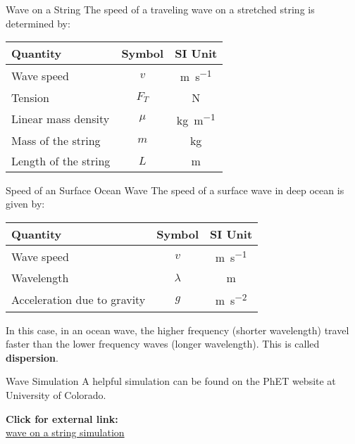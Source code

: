 \documentclass[12pt,aspectratio=169]{beamer}
\newcommand{\eq}[2]{\vspace{#1}{\Large\begin{displaymath}#2\end{displaymath}}}
\begin{document}
\begin{frame}{Wave on a String}
  The speed of a traveling wave on a stretched string is determined by:
  
  \eq{-.2in}{
    \boxed{v=\sqrt{\frac{F_T}{\mu}}}
    \quad\text{\normalsize where}\quad
    \boxed{\mu=\frac{m}L}
  }
  \begin{center}
    \begin{tabular}{l|c|c}
      \rowcolor{pink}
      \textbf{Quantity} & \textbf{Symbol} & \textbf{SI Unit} \\ \hline
      Wave speed           & $v$   & \si{\metre\per\second} \\
      Tension              & $F_T$ & \si\newton \\
      Linear mass density  & $\mu$ & \si{\kilo\gram\per\metre} \\
      Mass of the string   & $m$   & \si{\kilo\gram} \\
      Length of the string & $L$   & \si\metre
    \end{tabular}
  \end{center}
\end{frame}



\begin{frame}{Speed of an Surface Ocean Wave}
  The speed of a surface wave in deep ocean is given by:
  
  \eq{-.2in}{
    \boxed{v=\sqrt{\frac{\lambda g}{2\pi}}}
  }
  \begin{center}
    \begin{tabular}{l|c|c}
      \rowcolor{pink}
      \textbf{Quantity} & \textbf{Symbol} & \textbf{SI Unit} \\ \hline
      Wave speed           & $v$       & \si{\metre\per\second} \\
      Wavelength           & $\lambda$ & \si\metre \\
      Acceleration due to gravity & $g$ & \si{\metre\per\second\squared}
    \end{tabular}
  \end{center}
  In this case, in an ocean wave, the higher frequency (shorter wavelength)
  travel faster than the lower frequency waves (longer wavelength). This is
  called \textbf{dispersion}.
\end{frame}





\begin{frame}{Wave Simulation}
  A helpful simulation can be found on the PhET website at University of
  Colorado.
  \begin{center}
    \textbf{Click for external link:}\\
    \href{https://phet.colorado.edu/sims/html/wave-on-a-string/latest/wave-on-a-string_en.html}
         {wave on a string simulation}
  \end{center}
\end{frame}
\end{document}
